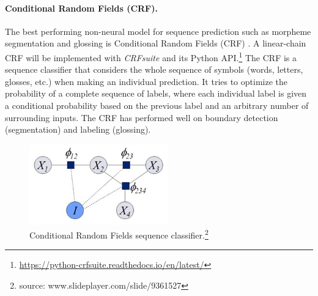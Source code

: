 \paragraph{Conditional Random Fields (CRF).} The best performing non-neural model for sequence prediction such as morpheme segmentation and glossing is Conditional Random Fields (CRF) \citep{lafferty_conditional_2001,muller_efficient_2013,ruokolainen_comparative_2016}. A linear-chain CRF \citep{lafferty_conditional_2001} will be implemented with \textit{CRFsuite} \citep{okazaki2007} and its Python API.\footnote{\url{https://python-crfsuite.readthedocs.io/en/latest/}} 
The CRF is a sequence classifier that considers the whole sequence of symbols (words, letters, glosses, etc.) when making an individual prediction. It tries to optimize the probability of a complete sequence of labels, where each individual label is given a conditional probability based on the previous label and an arbitrary number of surrounding inputs. %
The CRF has performed well on boundary detection (segmentation) and labeling (glossing). 


\begin{figure}
    \centering
    \includegraphics[width=6cm]{figs/CRF.jpg}
    \caption[Conditional Random Fields]{Conditional Random Fields sequence classifier.\footnote{source: www.slideplayer.com/slide/9361527}}
    \label{fig:CRF}
\end{figure}

